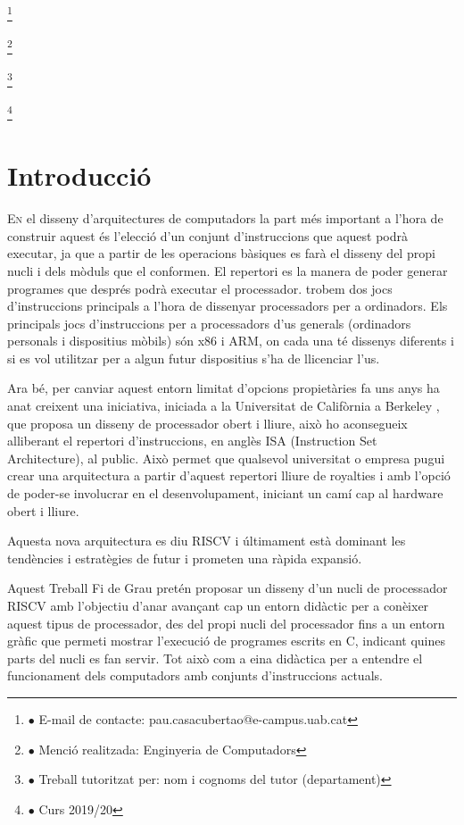 \documentclass[10pt,a4paper,twocolumn,twoside]{article}
\newcommand\blfootnote[1]{%
  \begingroup
  \renewcommand\thefootnote{}\footnote{#1}%
  \addtocounter{footnote}{-1}%
  \endgroup
}
\begin{document}
\blfootnote{$\bullet$ E-mail de contacte: pau.casacubertao@e-campus.uab.cat}
\blfootnote{$\bullet$ Menció realitzada: Enginyeria de Computadors }
\blfootnote{$\bullet$ Treball tutoritzat per: nom i cognoms del tutor (departament)}
\blfootnote{$\bullet$ Curs 2019/20}

\section{Introducció}
\lettrine[lines=3]{E}{n} el disseny d'arquitectures de computadors la part més important a l'hora de construir aquest és l'elecció d'un conjunt d'instruccions que aquest podrà executar, ja que a partir de les operacions bàsiques es farà el disseny del propi nucli i dels mòduls que el conformen. 
El repertori es la manera de poder generar programes que després podrà executar el processador.  trobem dos jocs d'instruccions principals a l'hora de dissenyar processadors per a ordinadors. 
Els principals jocs d'instruccions per a processadors d'us generals (ordinadors personals i dispositius mòbils) són x86 i ARM, on cada una té dissenys diferents i si es vol utilitzar per a algun futur dispositius s'ha de llicenciar l'us.

Ara bé, per canviar aquest entorn limitat d'opcions propietàries fa uns anys ha anat creixent una iniciativa, iniciada a la Universitat de Califòrnia a Berkeley \cite{krste_asanovic_instruction_2014}, que proposa un disseny de processador obert i lliure, això ho aconsegueix alliberant el repertori d'instruccions, en anglès ISA (Instruction Set Architecture), al public. Això permet que qualsevol universitat o empresa pugui crear una arquitectura a partir d'aquest repertori lliure de royalties i amb l'opció de poder-se involucrar en el desenvolupament, iniciant un camí cap al hardware obert i lliure. 

Aquesta nova arquitectura es diu RISCV i últimament està dominant les tendències i estratègies de futur i prometen una ràpida expansió.

Aquest Treball Fi de Grau pretén proposar un disseny d'un nucli de processador RISCV amb l’objectiu d’anar avançant cap un entorn didàctic per a conèixer aquest tipus de processador, des del propi nucli del processador fins a un entorn gràfic que permeti mostrar l'execució de programes escrits en C, indicant quines parts del nucli es fan servir.
Tot això com a eina didàctica per a entendre el funcionament dels computadors amb conjunts d'instruccions actuals. 
\end{document}
